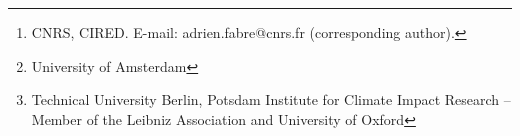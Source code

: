 \author{Adrien Fabre\footnote{CNRS, CIRED. E-mail: adrien.fabre@cnrs.fr (corresponding author).}, Thomas Douenne\footnote{University of Amsterdam}\; and Linus Mattauch\footnote{Technical University Berlin, Potsdam Institute for Climate Impact Research -- Member of the Leibniz Association and University of Oxford}} 

\date{\today} %



\maketitle

\begin{center}
\end{center}



